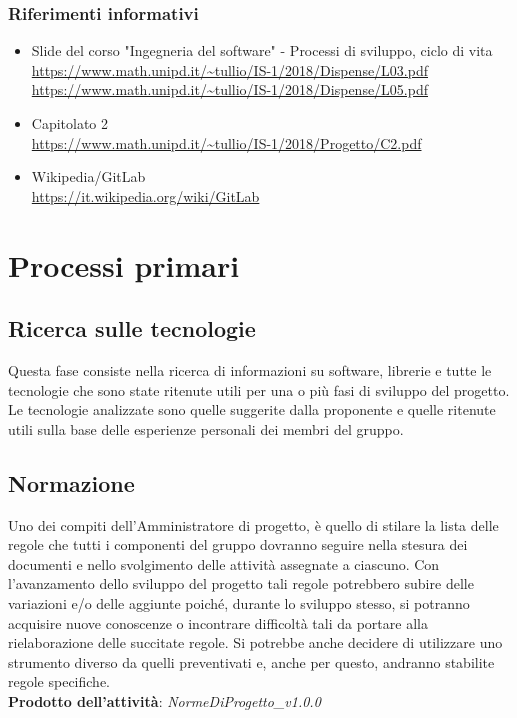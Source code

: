 \documentclass[11pt,a4paper]{article}
\begin{document}
	\subsubsection{Riferimenti informativi}
	\begin{itemize}
		\item Slide del corso "Ingegneria del software" - Processi di sviluppo, ciclo di vita \\
		\url {https://www.math.unipd.it/~tullio/IS-1/2018/Dispense/L03.pdf} \\
		\url {https://www.math.unipd.it/~tullio/IS-1/2018/Dispense/L05.pdf}
		\item Capitolato 2 \\
		\url {https://www.math.unipd.it/~tullio/IS-1/2018/Progetto/C2.pdf}
		\item Wikipedia/GitLab \\
		\url {https://it.wikipedia.org/wiki/GitLab}
	\end{itemize}					
	\newpage
	
	\section{Processi primari}
	\subsection{Ricerca sulle tecnologie} 
	Questa fase consiste nella ricerca di informazioni su software, librerie e tutte le tecnologie che sono state ritenute utili per una o più fasi di sviluppo del progetto. Le tecnologie analizzate  sono quelle suggerite dalla proponente e quelle ritenute utili sulla base delle esperienze personali dei membri del gruppo. 
	
	
	\subsection{Normazione}
	Uno dei compiti dell'Amministratore di progetto, è quello di stilare la lista delle regole che tutti i componenti del gruppo dovranno seguire nella stesura dei documenti e nello svolgimento delle attività assegnate a ciascuno. Con l'avanzamento dello sviluppo del progetto tali regole potrebbero subire delle variazioni e/o delle aggiunte poiché, durante lo sviluppo stesso, si potranno acquisire nuove conoscenze o incontrare difficoltà tali da portare alla rielaborazione delle succitate regole. Si potrebbe anche decidere di utilizzare uno strumento diverso da quelli preventivati e, anche per questo, andranno stabilite regole specifiche.\\
	\textbf{Prodotto dell'attività}: \textit{NormeDiProgetto\_v1.0.0}
	
\end{document}

